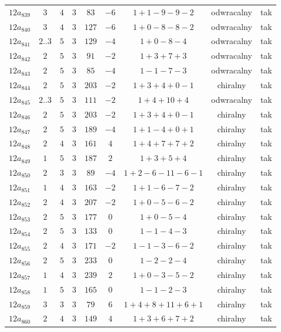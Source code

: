 \begin{longtable}{ccccccccc}
$12a_{839}$ & $3$ & $4$ & $3$ & $83$ & $-6$ & $1+1-9-9-2$ & odwracalny & tak \\
$12a_{840}$ & $3$ & $4$ & $3$ & $127$ & $-6$ & $1+0-8-8-2$ & odwracalny & tak \\
$12a_{841}$ & $2..3$ & $5$ & $3$ & $129$ & $-4$ & $1+0-8-4$ & odwracalny & tak \\
$12a_{842}$ & $2$ & $5$ & $3$ & $91$ & $-2$ & $1+3+7+3$ & odwracalny & tak \\
$12a_{843}$ & $2$ & $5$ & $3$ & $85$ & $-4$ & $1-1-7-3$ & odwracalny & tak \\
$12a_{844}$ & $2$ & $5$ & $3$ & $203$ & $-2$ & $1+3+4+0-1$ & chiralny & tak \\
$12a_{845}$ & $2..3$ & $5$ & $3$ & $111$ & $-2$ & $1+4+10+4$ & odwracalny & tak \\
$12a_{846}$ & $2$ & $5$ & $3$ & $203$ & $-2$ & $1+3+4+0-1$ & chiralny & tak \\
$12a_{847}$ & $2$ & $5$ & $3$ & $189$ & $-4$ & $1+1-4+0+1$ & chiralny & tak \\
$12a_{848}$ & $2$ & $4$ & $3$ & $161$ & $4$ & $1+4+7+7+2$ & chiralny & tak \\
$12a_{849}$ & $1$ & $5$ & $3$ & $187$ & $2$ & $1+3+5+4$ & chiralny & tak \\
$12a_{850}$ & $2$ & $3$ & $3$ & $89$ & $-4$ & $1+2-6-11-6-1$ & chiralny & tak \\
$12a_{851}$ & $1$ & $4$ & $3$ & $163$ & $-2$ & $1+1-6-7-2$ & chiralny & tak \\
$12a_{852}$ & $2$ & $4$ & $3$ & $207$ & $-2$ & $1+0-5-6-2$ & chiralny & tak \\
$12a_{853}$ & $2$ & $5$ & $3$ & $177$ & $0$ & $1+0-5-4$ & chiralny & tak \\
$12a_{854}$ & $2$ & $5$ & $3$ & $133$ & $0$ & $1-1-4-3$ & chiralny & tak \\
$12a_{855}$ & $2$ & $4$ & $3$ & $171$ & $-2$ & $1-1-3-6-2$ & chiralny & tak \\
$12a_{856}$ & $2$ & $5$ & $3$ & $233$ & $0$ & $1-2-2-4$ & chiralny & tak \\
$12a_{857}$ & $1$ & $4$ & $3$ & $239$ & $2$ & $1+0-3-5-2$ & chiralny & tak \\
$12a_{858}$ & $1$ & $5$ & $3$ & $165$ & $0$ & $1-1-2-3$ & chiralny & tak \\
$12a_{859}$ & $3$ & $3$ & $3$ & $79$ & $6$ & $1+4+8+11+6+1$ & chiralny & tak \\
$12a_{860}$ & $2$ & $4$ & $3$ & $149$ & $4$ & $1+3+6+7+2$ & chiralny & tak \\

\end{longtable}
